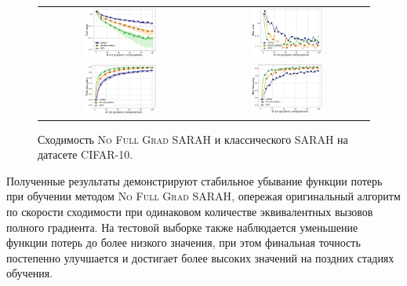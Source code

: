\begin{figure}[H]
\centering
\begin{tabular}{cc}
\includegraphics[width=0.45\textwidth]{plots/sarah_10-train-loss_compressed.pdf} &
\includegraphics[width=0.45\textwidth]{plots/sarah_10-test-loss_compressed.pdf} \\
\includegraphics[width=0.45\textwidth]{plots/sarah_10-train-accuracy_compressed.pdf} &
\includegraphics[width=0.45\textwidth]{plots/sarah_10-test-accuracy_compressed.pdf} \\
\end{tabular}
\caption{Сходимость \textsc{No Full Grad SARAH} и классического \textsc{SARAH} на датасете CIFAR-10.}
\label{fig:sarah_10}
\end{figure}

Полученные результаты демонстрируют стабильное убывание функции потерь при обучении методом \textsc{No Full Grad SARAH}, опережая оригинальный алгоритм по скорости сходимости при одинаковом количестве эквивалентных вызовов полного градиента. На тестовой выборке также наблюдается уменьшение функции потерь до более низкого значения, при этом финальная точность постепенно улучшается и достигает более высоких значений на поздних стадиях обучения.

